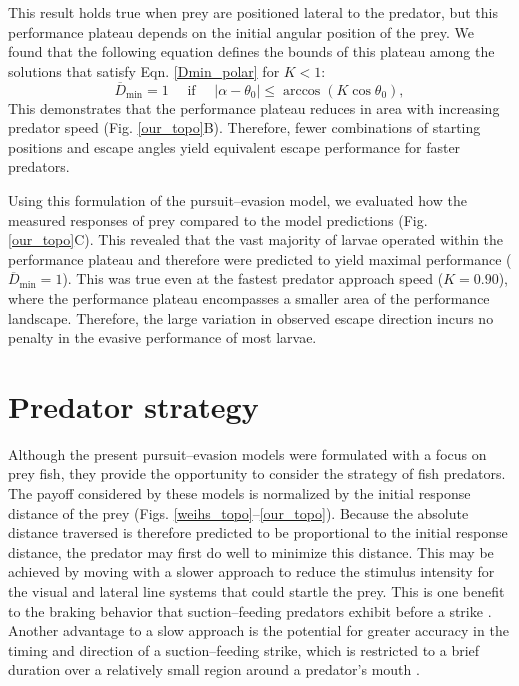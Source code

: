 \documentclass[12pt]{article}
\newcommand{\ol}{\overline}
\begin{document}
This result holds true when prey are positioned lateral to the predator, but this performance plateau depends on the initial angular position of the prey. We found that the following equation defines the bounds of this plateau among the solutions that satisfy Eqn. \ref{Dmin_polar} for $K<1$:
%
\begin{equation}
\ol D_{\text{min}}=1 \quad \text{ if }  \quad |\alpha - \theta_0|  \leq    \arccos(K \cos  \theta_0) ,
 \end{equation}
%
This demonstrates that the performance plateau reduces in area with increasing predator speed (Fig. \ref{our_topo}B). Therefore, fewer combinations of starting positions and escape angles yield equivalent escape performance for faster predators.

Using this formulation of the pursuit--evasion model, we evaluated how the measured responses of prey compared to the model predictions (Fig. \ref{our_topo}C). This revealed that the vast majority of larvae operated within the performance plateau and therefore were predicted to yield maximal performance ($\ol D_{\text{min}}=1$). 
This was true even at the fastest predator approach speed ($K=0.90$), where the performance plateau encompasses a smaller area of the performance landscape. Therefore, the large variation in observed escape direction incurs no penalty in the evasive performance of most larvae. 


\section{Predator strategy}

Although the present pursuit--evasion models were formulated with a focus on prey fish, they provide the opportunity to consider the strategy of fish predators. The payoff considered by these models is normalized by the initial response distance of the prey (Figs. \ref{weihs_topo}--\ref{our_topo}). Because the absolute distance traversed is therefore predicted to be proportional to the initial response distance, the predator may first do well to minimize this distance. 
This may be achieved by moving with a slower approach to reduce the stimulus intensity for the visual \citep{Dill:1974ws} and lateral line \citep{Stewart:2014cm} systems that could startle the prey. This is one benefit to the braking behavior that suction--feeding predators exhibit before a strike \citep{Higham:2007go, Higham:2005iu}. 
Another advantage to a slow approach is the potential for greater accuracy in the timing and direction of a suction--feeding strike, which is restricted to a brief duration over a relatively small region around a predator's mouth \citep{Wainwright:2001ufa}. 
\end{document}
